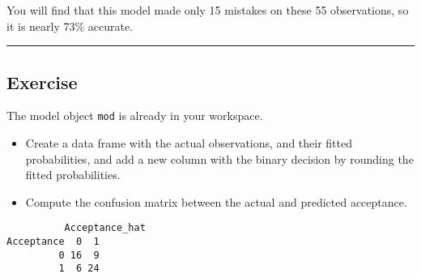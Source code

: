 \documentclass[]{book}
\newenvironment{Shaded}{\begin{snugshade}}{\end{snugshade}}
\newcommand{\KeywordTok}[1]{\textcolor[rgb]{0.13,0.29,0.53}{\textbf{#1}}}
\newcommand{\DataTypeTok}[1]{\textcolor[rgb]{0.13,0.29,0.53}{#1}}
\newcommand{\StringTok}[1]{\textcolor[rgb]{0.31,0.60,0.02}{#1}}
\newcommand{\CommentTok}[1]{\textcolor[rgb]{0.56,0.35,0.01}{\textit{#1}}}
\newcommand{\OperatorTok}[1]{\textcolor[rgb]{0.81,0.36,0.00}{\textbf{#1}}}
\newcommand{\NormalTok}[1]{#1}
\providecommand{\tightlist}{%
  \setlength{\itemsep}{0pt}\setlength{\parskip}{0pt}}
\begin{document}
You will find that this model made only 15 mistakes on these 55
observations, so it is nearly 73\% accurate.

\begin{center}\rule{0.5\linewidth}{\linethickness}\end{center}

\subsection*{Exercise}\label{exercise-20}

The model object \texttt{mod} is already in your workspace.

\begin{itemize}
\tightlist
\item
  Create a data frame with the actual observations, and their fitted
  probabilities, and add a new column with the binary decision by
  rounding the fitted probabilities.
\end{itemize}

\begin{Shaded}
\end{Shaded}

\begin{itemize}
\tightlist
\item
  Compute the confusion matrix between the actual and predicted
  acceptance.
\end{itemize}

\begin{Shaded}
\end{Shaded}

\begin{verbatim}
          Acceptance_hat
Acceptance  0  1
         0 16  9
         1  6 24
\end{verbatim}
\end{document}
